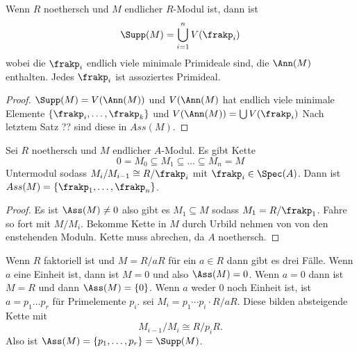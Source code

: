\begin{Kor} Wenn \(R\) noethersch und \(M\) endlicher \(R\)-Modul ist, dann ist \[\Supp(M)=\bigcup_{i=1}^nV(\frakp_i)\]
	wobei die \(\frakp_i\) endlich viele minimale Primideale sind, die \(\Ann(M)\) enthalten. Jedes \(\frakp_i\) ist assoziertes
	Primideal.
	
\end{Kor}
\begin{proof}
	\(\Supp(M)=V(\Ann(M))\) und \(V(\Ann(M)\) hat endlich viele minimale Elemente \(\{\frakp_i,\dots,\frakp_k\}\)
	und \(V(\Ann(M))=\bigcup V(\frakp_i)\) Nach letztem Satz ?? sind diese in \(Ass(M)\).
\end{proof}
\begin{Satz} Sei \( R \) noethersch und \(M\) endlicher \(A\)-Modul. Es gibt Kette
	\[0=M_0\subseteq M_1\subseteq\dots\subseteq M_n=M\] Untermodul sodass
	\(M_i/M_{i-1} \cong R/\frakp_i \) mit \(\frakp_i\in\Spec(A)\).
	Dann ist \(Ass(M)=\{\frakp_1,\dots,\frakp_n\}\).
	
\end{Satz}
\begin{proof}
	Es ist \(\Ass(M)\neq 0\) also gibt es \(M_1\subseteq M\) sodass \(M_1=R/\frakp_1\).
	Fahre so fort mit \(M/M_i\).
	Bekomme Kette in \(M\) durch Urbild nehmen von von den enstehenden Moduln. Kette muss abrechen, da \(A\) noethersch.
\end{proof}
\begin{Bsp}
	Wenn \(R\) faktoriell ist und \(M=R/aR\) für ein \(a\in R\) dann gibt es drei Fälle. 
	Wenn \(a\) eine Einheit ist, dann ist \(M=0\) und also \(\Ass(M)=0\). Wenn \(a=0\) dann ist
	\(M=R\) und dann \(\Ass(M)=\{0\}\).
	Wenn \(a\) weder \(0\) noch Einheit ist, ist \(a=p_1\dots p_r\) für Primelemente \(p_i\).
	sei \(M_i=p_1\cdots p_i\cdot R/aR\). Diese bilden absteigende Kette mit 
	\[M_{i-1}/M_i\cong R/p_iR.\]
	Also ist \(\Ass(M)=\{p_1,\dots,p_r\}=\Supp(M)\).
\end{Bsp}